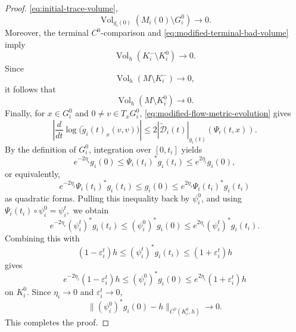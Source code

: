 \documentclass[10pt,a4paper]{amsart}
\begin{document}
\begin{proof}
\eqref{eq:initial-trace-volume},
\[
        \operatorname{Vol}_{g_i(0)}
        (M_i(0)\setminus G_i^0)\to0.
\]
Moreover, the terminal \(C^0\)-comparison and
\eqref{eq:modified-terminal-bad-volume} imply
\[
        \operatorname{Vol}_h(K_i^-\setminus K_i^0)\to0.
\]
Since
\[
        \operatorname{Vol}_h(M\setminus K_i^-)\to0,
\]
it follows that
\[
        \operatorname{Vol}_h(M\setminus K_i^0)\to0.
\]
Finally, for \(x\in G_i^0\) and \(0\neq v\in T_xG_i^0\),
\eqref{eq:modified-flow-metric-evolution} gives
\[
        \left|
        \frac{d}{dt}
        \log\bigl(\check g_i(t)_x(v,v)\bigr)
        \right|
        \leq
        2|\widetilde{\mathcal D}_i(t)|_{g_i(t)}
        (\Psi_i(t,x)).
\]
By the definition of \(G_i^0\), integration over \([0,t_i]\) yields
\[
        e^{-2\eta_i}g_i(0)
        \leq
        \Psi_i(t_i)^*g_i(t_i)
        \leq
        e^{2\eta_i}g_i(0),
\]
or equivalently,
\[
        e^{-2\eta_i}\Psi_i(t_i)^*g_i(t_i)
        \leq
        g_i(0)
        \leq
        e^{2\eta_i}\Psi_i(t_i)^*g_i(t_i)
\]
as quadratic forms.
Pulling this inequality back by \(\psi_i^0\), and using
$\Psi_i(t_i)\circ\psi_i^0=\psi_i^t,$
we obtain
\[
        e^{-2\eta_i}(\psi_i^t)^*g_i(t_i)
        \leq
        (\psi_i^0)^*g_i(0)
        \leq
        e^{2\eta_i}(\psi_i^t)^*g_i(t_i).
\]
Combining this with
\[
        (1-\varepsilon_i^t)h
        \leq
        (\psi_i^t)^*g_i(t_i)
        \leq
        (1+\varepsilon_i^t)h
\]
gives
\[
        e^{-2\eta_i}(1-\varepsilon_i^t)h
        \leq
        (\psi_i^0)^*g_i(0)
        \leq
        e^{2\eta_i}(1+\varepsilon_i^t)h
\]
on \(K_i^0\). Since
\(\eta_i\to0\) and \(\varepsilon_i^t\to0\),
\[
        \|(\psi_i^0)^*g_i(0)-h
        \|_{C^0(K_i^0,h)}
        \longrightarrow0.
\]
This completes the proof.
\end{proof}
\end{document}
